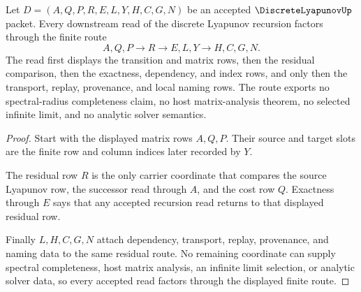 \begin{theorem}
\label{thm:discrete-lyapunov-residual-route}
Let $D=(A,Q,P,R,E,L,Y,H,C,G,N)$ be an accepted $\DiscreteLyapunovUp$ packet. Every downstream read of the discrete Lyapunov recursion factors through the finite route
$$
A,Q,P \longrightarrow R \longrightarrow E,L,Y \longrightarrow H,C,G,N .
$$
The read first displays the transition and matrix rows, then the residual comparison, then the exactness, dependency, and index rows, and only then the transport, replay, provenance, and local naming rows. The route exports no spectral-radius completeness claim, no host matrix-analysis theorem, no selected infinite limit, and no analytic solver semantics.
\end{theorem}
\begin{proof}
Start with the displayed matrix rows $A,Q,P$. Their source and target slots are the finite row and column indices later recorded by $Y$.

The residual row $R$ is the only carrier coordinate that compares the source Lyapunov row, the successor read through $A$, and the cost row $Q$. Exactness through $E$ says that any accepted recursion read returns to that displayed residual row.

Finally $L,H,C,G,N$ attach dependency, transport, replay, provenance, and naming data to the same residual route. No remaining coordinate can supply spectral completeness, host matrix analysis, an infinite limit selection, or analytic solver data, so every accepted read factors through the displayed finite route.
\end{proof}




